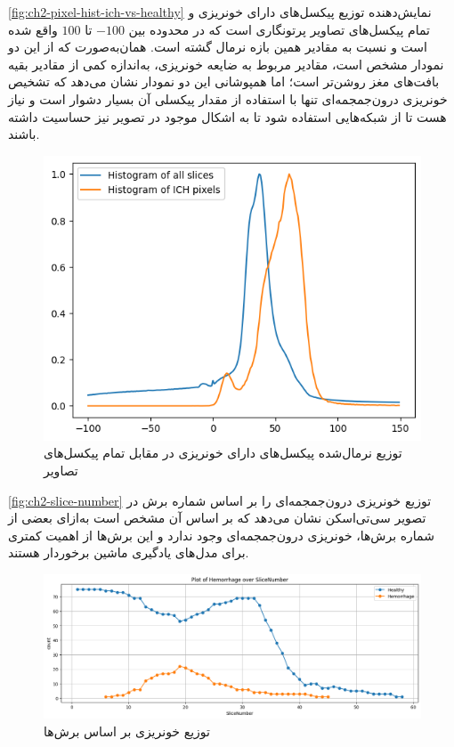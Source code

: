 \autoref{fig:ch2-pixel-hist-ich-vs-healthy}
نمایش‌دهنده توزیع پیکسل‌های دارای خونریزی و تمام پیکسل‌های تصاویر پرتونگاری است که در محدوده بین 
$-100$
تا 
$100$
واقع شده است و نسبت به مقادیر همین بازه نرمال گشته است. همان‌به‌صورت که از این دو نمودار مشخص است، مقادیر مربوط به ضایعه خونریزی،‌ به‌اندازه کمی از مقادیر بقیه بافت‌های مغز روشن‌تر است؛ اما همپوشانی این دو نمودار نشان می‌دهد که تشخیص خونریزی درون‌جمجمه‌ای تنها با استفاده از مقدار پیکسلی آن بسیار دشوار است و نیاز هست تا از شبکه‌هایی استفاده شود تا به اشکال موجود در تصویر نیز حساسیت داشته باشند.


\begin{figure}[h]
\centering
\includegraphics[width=1.0\linewidth]{"Images/Chapter2/pixel hist ich vs healthy"}
\caption{توزیع نرمال‌شده پیکسل‌های دارای خونریزی در مقابل تمام پیکسل‌های تصاویر}
\label{fig:ch2-pixel-hist-ich-vs-healthy}
\end{figure}


\autoref{fig:ch2-slice-number}
توزیع خونریزی درون‌جمجمه‌ای را بر اساس شماره برش در تصویر سی‌تی‌اسکن نشان می‌دهد که بر اساس آن مشخص است به‌ازای بعضی از شماره برش‌ها، خونریزی درون‌جمجمه‌ای وجود ندارد و این برش‌ها از اهمیت کمتری برای مدل‌های یادگیری ماشین برخوردار هستند.

\begin{figure}[h]
\centering
\includegraphics[width=1.0\linewidth]{"Images/Chapter2/slice hist"}
\caption{توزیع خونریزی بر اساس برش‌ها}
\label{fig:ch2-slice-hist}
\end{figure}


